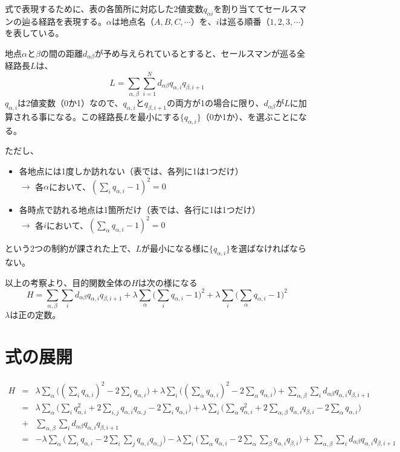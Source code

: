 式で表現するために、表の各箇所に対応した2値変数$q_{\alpha i}$を割り当ててセールスマンの辿る経路を表現する。$\alpha$は地点名（$A,B,C,\cdots$）を、$i$は巡る順番（$1,2,3,\cdots$）を表している。

地点$\alpha$と$\beta$の間の距離$d_{\alpha \beta}$が予め与えられているとすると、セールスマンが巡る全経路長$L$は、
\[
L = \sum_{\alpha,\beta}\sum_{i=1}^N d_{\alpha \beta}q_{\alpha, i}q_{\beta, i+1}
\]
$q_{\alpha,i}$は2値変数（0か1）なので、$q_{\alpha, i}$と$q_{\beta, i+1}$の両方が1の場合に限り、$d_{\alpha \beta}$が$L$に加算される事になる。この経路長$L$を最小にする$\{q_{\alpha,i}\}$（0か1か）、を選ぶことになる。

ただし、
\begin{itemize}
\item 各地点には1度しか訪れない（表では、各列に1は1つだけ）\\
$\longrightarrow$ 各$\alpha$において、$(\sum_i q_{\alpha, i} - 1)^2=0$
\item 各時点で訪れる地点は1箇所だけ（表では、各行に1は1つだけ）\\
$\longrightarrow$ 各$i$において、$(\sum_\alpha q_{\alpha, i} - 1)^2=0$
\end{itemize}
という2つの制約が課された上で、$L$が最小になる様に$\{q_{\alpha, i}\}$を選ばなければならない。

以上の考察より、目的関数全体の$H$は次の様になる
\[
H=\sum_{\alpha,\beta}\sum_i d_{\alpha\beta}q_{\alpha, i}q_{\beta, i+1} + \lambda\sum_\alpha\bigg(\sum_i q_{\alpha, i} - 1\bigg)^2 + \lambda\sum_i\bigg(\sum_\alpha q_{\alpha, i} - 1\bigg)^2
\]
$\lambda$は正の定数。

\section{式の展開}

\begin{eqnarray*}
  H &=& \lambda\sum_\alpha\bigg((\sum_i q_{\alpha, i})^2 - 2 \sum_i q_{\alpha, i}\bigg) + \lambda\sum_i\bigg((\sum_\alpha q_{\alpha, i})^2 - 2\sum_\alpha q_{\alpha, i}\bigg) + \sum_{\alpha,\beta}\sum_i d_{\alpha\beta}q_{\alpha, i}q_{\beta, i+1}\\
  &=& \lambda\sum_\alpha\bigg(\sum_i q_{\alpha,i}^2 +2\sum_{i,j}q_{\alpha,i}q_{\alpha,j}-2\sum_i q_{\alpha,i}\bigg) + \lambda\sum_i\bigg(\sum_\alpha q_{\alpha,i}^2 +2\sum_{\alpha,\beta}q_{\alpha,i}q_{\beta,i}-2\sum_\alpha q_{\alpha,i}\bigg)\\
  &+& \sum_{\alpha,\beta}\sum_i d_{\alpha\beta}q_{\alpha, i}q_{\beta, i+1}\\
&=& -\lambda\sum_\alpha\bigg(\sum_i q_{\alpha,i} - 2\sum_i\sum_j q_{\alpha,i}q_{\alpha,j}\bigg) - \lambda\sum_i\bigg(\sum_\alpha q_{\alpha,i} - 2\sum_\alpha\sum_\beta q_{\alpha,i}q_{\beta,i}\bigg) + \sum_{\alpha,\beta}\sum_i d_{\alpha\beta}q_{\alpha, i}q_{\beta, i+1}
\end{eqnarray*}

